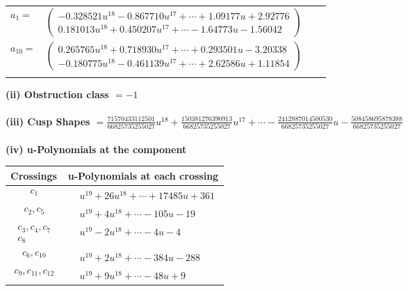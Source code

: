 \documentclass[1p]{elsarticle_modified}
\theoremstyle{definition}
\begin{document}
\begin{tabular}{m{7pt} m{180pt} m{7pt} m{180pt} }
\flushright $a_{1}=$&$\begin{pmatrix}-0.328521 u^{18}-0.867710 u^{17}+\cdots+1.09177 u+2.92776\\0.181013 u^{18}+0.450207 u^{17}+\cdots-1.64773 u-1.56042\end{pmatrix}$ \\
\flushright $a_{10}=$&$\begin{pmatrix}0.265765 u^{18}+0.718930 u^{17}+\cdots+0.293501 u-3.20338\\-0.180775 u^{18}-0.461139 u^{17}+\cdots+2.62586 u+1.11854\end{pmatrix}$\\&\end{tabular}
\flushleft \textbf{(ii) Obstruction class $= -1$}\\~\\
\flushleft \textbf{(iii) Cusp Shapes $= \frac{71570433112501}{66825735255027} u^{18}+\frac{150381276390913}{66825735255027} u^{17}+\cdots-\frac{2412887014500530}{66825735255027} u-\frac{508458695878388}{66825735255027}$}\\~\\
\newpage\renewcommand{\arraystretch}{1}
\flushleft \textbf{(iv) u-Polynomials at the component}\newline \\
\begin{tabular}{m{50pt}|m{274pt}}
Crossings & \hspace{64pt}u-Polynomials at each crossing \\
\hline $$\begin{aligned}c_{1}\end{aligned}$$&$\begin{aligned}
&u^{19}+26 u^{18}+\cdots+17485 u+361
\end{aligned}$\\
\hline $$\begin{aligned}c_{2},c_{5}\end{aligned}$$&$\begin{aligned}
&u^{19}+4 u^{18}+\cdots-105 u-19
\end{aligned}$\\
\hline $$\begin{aligned}c_{3},c_{4},c_{7}\\c_{8}\end{aligned}$$&$\begin{aligned}
&u^{19}-2 u^{18}+\cdots-4 u-4
\end{aligned}$\\
\hline $$\begin{aligned}c_{6},c_{10}\end{aligned}$$&$\begin{aligned}
&u^{19}+2 u^{18}+\cdots-384 u-288
\end{aligned}$\\
\hline $$\begin{aligned}c_{9},c_{11},c_{12}\end{aligned}$$&$\begin{aligned}
&u^{19}+9 u^{18}+\cdots-48 u+9
\end{aligned}$\\
\hline
\end{tabular}\\~\\
\end{document}
